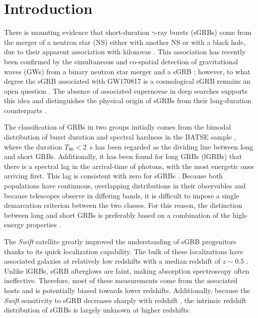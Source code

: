 \documentclass[longauth]{aa}    %
\begin{document}
\section{Introduction}

There is mounting evidence that short-duration $\gamma$-ray bursts (sGRBs) come
from the merger of a neutron star (NS)  either with another NS or with a black hole,
due to their apparent association with kilonovae \citep{Barnes2013a,
        Tanvir2013b, Berger2013b, Yang2015, Jin2016, Rosswog2016}. This association has
recently been confirmed by the simultaneous and co-spatial detection of gravitational
waves (GWs) from a binary neutron star merger and a sGRB
\citep{LIGOScientificCollaboration2017a, Goldstein2017, Savchenko2017}; however,
to what degree the sGRB associated with GW170817 is a cosmological sGRB remains
an open question \citep{Lyman2018, Margutti2018}. The absence of associated
supernovae in deep searches \citep[e.g.,][]{Hjorth2005a,Fox2005,Hjorth2005b,
        Kann2011} supports this idea and distinguishes the physical origin of sGRBs from
their long-duration counterparts \citep[but see also][]{Fynbo2006b,
        Valle2006, Gal-Yam2006}.

The classification of GRBs in two groups initially comes from the bimodal
distribution of burst duration and spectral hardness in the BATSE sample \citep{Kouveliotou1993},
where the duration $T_{90} < 2$~s has been regarded as the dividing line between long
and short GRBs. Additionally, it has been found for long GRBs (lGRBs) that there is a
spectral lag in the arrival-time of photons, with the most energetic ones
arriving first. This lag is consistent with zero for sGRBs
\citep{Norris2006}. Because both populations have continuous, overlapping
distributions in their observables and because telescopes observe in differing
bands, it is difficult to impose a single demarcation criterion between the two
classes. For this reason, the distinction between long and short GRBs is
preferably based on a combination of the high-energy properties \citep{Zhang2009,
        Kann2011, Bromberg2012a, Bromberg2013}.

The \textit{Swift} satellite \citep{Gehrels2004} greatly improved the
understanding of sGRB progenitors thanks to its quick localization capability.
The bulk of these localizations have associated galaxies at relatively low
redshifts with a median redshift of $z\sim0.5$ \citep{Berger2014}. Unlike lGRBs,
sGRB afterglows are faint, making absorption spectroscopy often ineffective.
Therefore, most of these measurements come from the associated hosts and is
potentially biased towards lower redshifts. Additionally, because the
\textit{Swift} sensitivity to sGRB decreases sharply with redshift
\citep{Behroozi2014}, the intrinsic redshift distribution of sGRBs is largely
unknown at higher redshifts.
\end{document}
